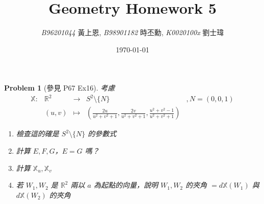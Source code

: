 \documentclass[10pt,a4paper]{article}
\newcommand{\LiHei}{\CJKfamily{lh}}
\newcounter{theProblemCounter}
\newtheorem{problem}[theProblemCounter]{Problem}
\begin{document}
\title{{Geometry Homework 5}}
\author{{\it{B96201044}} {\LiHei 黃上恩}, {\it{B98901182}} {\LiHei 時丕勳}, {\it{K0020100x}} {\LiHei 劉士瑋}}
\date{\today}
\maketitle

\newcommand{\bx}{\mathbb{X}}
\setcounter{theProblemCounter}{0}
\begin{problem}[參見 P67 Ex16]
考慮
\[
\begin{array}{ccccc}
\bx: & \mathbb{R}^2 & \to & S^2\setminus \{N\} & , N=(0,0,1) \\
& (u, v) & \mapsto & \left(\frac{2u}{u^2+v^2+1}, \frac{2v}{u^2+v^2+1},\frac{u^2+v^2-1}{u^2+v^2+1}\right) &
\end{array}
\]

\begin{enumerate}
\item[(a)] 檢查這的確是 $S^2\setminus \{N\}$ 的參數式
\item[(b)] 計算 $E, F, G$，$E=G$ 嗎？
\item[(c)] 計算 $\bx_u, \bx_v$
\item[(d)] 若 $W_1, W_2$ 是 $\mathbb{R}^2$ 兩以 $a$ 為起點的向量，說明 $W_1, W_2$ 的夾角 $=d\bx(W_1)$ 與 $d\bx(W_2)$ 的夾角
\end{enumerate}
\end{problem}
\end{document}
